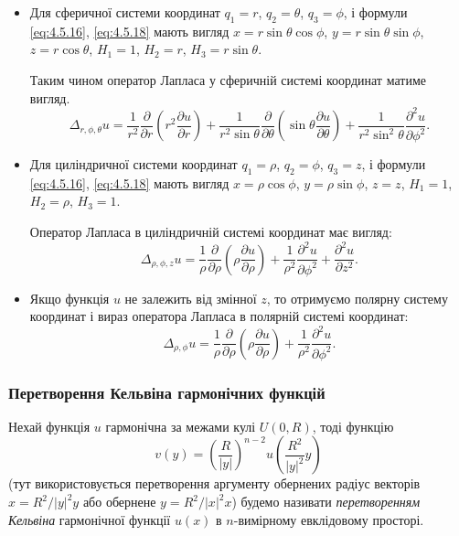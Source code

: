 \begin{itemize}
	\item Для сферичної системи координат $q_1 = r$, $q_2 = \theta$, $q_3 = \phi$, і формули \eqref{eq:4.5.16}, \eqref{eq:4.5.18} мають вигляд $x = r \sin \theta \cos \phi$, $y = r \sin \theta \sin \phi$, $z = r \cos \theta$, $H_1 = 1$, $H_2 = r$, $H_3 = r \sin \theta$. \medskip

	Таким чином оператор Лапласа у сферичній системі координат матиме вигляд.
	\begin{equation}
		\label{eq:4.5.19}
		\Delta_{r, \phi, \theta} u = \frac{1}{r^2} \frac{\partial}{\partial r} \left( r^2 \frac{\partial u}{\partial r} \right) + \frac{1}{r^2 \sin \theta} \frac{\partial}{\partial \theta} \left( \sin \theta \frac{\partial u}{\partial \theta} \right) + \frac{1}{r^2 \sin^2 \theta} \frac{\partial^2 u}{\partial \phi^2}.
	\end{equation}

	\item Для циліндричної системи координат $q_1 = \rho$, $q_2 = \phi$, $q_3 = z$, і формули \eqref{eq:4.5.16}, \eqref{eq:4.5.18} мають вигляд $x = \rho \cos \phi$, $y = \rho \sin \phi$, $z = z$, $H_1 = 1$, $H_2 = \rho$, $H_3 = 1$. \medskip

	Оператор Лапласа в циліндричній системі координат має вигляд:
	\begin{equation}
		\Delta_{\rho,\phi,z} u = \frac{1}{\rho} \frac{\partial}{\partial \rho} \left( \rho \frac{\partial u}{\partial \rho} \right) + \frac{1}{\rho^2} \frac{\partial^2 u}{\partial \phi^2} + \frac{\partial^2 u}{\partial z^2}.
	\end{equation}

	\item Якщо функція $u$ не залежить від змінної $z$, то отримуємо полярну систему координат і вираз оператора Лапласа в полярній системі координат:
	\begin{equation}
		\Delta_{\rho,\phi} u = \frac{1}{\rho} \frac{\partial}{\partial \rho} \left( \rho \frac{\partial u}{\partial \rho} \right) + \frac{1}{\rho^2} \frac{\partial^2 u}{\partial \phi^2}.
	\end{equation}
\end{itemize}

\subsubsection{Перетворення Кельвіна гармонічних функцій}

\begin{definition}
    Нехай функція $u$ гармонічна за межами кулі $U(0, R)$, тоді функцію
    \begin{equation}
        \label{eq:4.5.22}
        v(y) = \left( \frac{R}{|y|} \right)^{n - 2}  u \left( \frac{R^2}{|y|^2}  y \right)
    \end{equation}
    (тут використовується перетворення аргументу обернених радіус векторів $x = R^2 / |y|^2  y$ або обернене $y = R^2 / |x|^2  x$) будемо називати \textit{перетворенням Кельвіна} гармонічної функції $u(x)$ в $n$-вимірному евклідовому просторі.
\end{definition}

